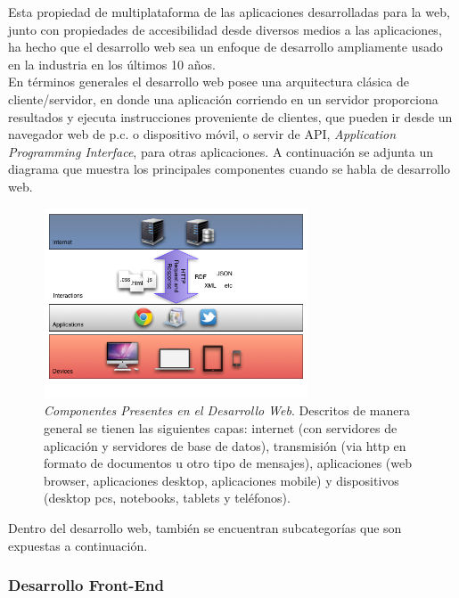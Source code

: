 Esta propiedad de multiplataforma de las aplicaciones desarrolladas para la web, junto con propiedades de accesibilidad desde diversos medios a las aplicaciones, ha hecho que el desarrollo web sea un enfoque de desarrollo ampliamente usado en la industria en los últimos 10 años.\\

En términos generales el desarrollo web posee una arquitectura clásica de cliente/servidor, en donde una aplicación corriendo en un servidor proporciona resultados y ejecuta instrucciones proveniente de clientes, que pueden ir desde un navegador web de p.c. o dispositivo móvil, o servir de API, \emph{Application Programming Interface}, para otras aplicaciones. A continuación se adjunta un diagrama que muestra los principales componentes cuando se habla de desarrollo web.\\

\begin{figure}[H]
  \centering
  \includegraphics[width=0.7\textwidth]{images/web_development.png}
  \caption[Componentes Presentes en el Desarrollo Web]{\emph{Componentes Presentes en el Desarrollo Web}. Descritos de manera general se tienen las siguientes capas: internet (con servidores de aplicación y servidores de base de datos), transmisión (via http en formato de documentos u otro tipo de mensajes), aplicaciones (web browser, aplicaciones desktop, aplicaciones mobile) y dispositivos (desktop pcs, notebooks, tablets y teléfonos).}
  \label{web_development}
\end{figure}

Dentro del desarrollo web, también se encuentran subcategorías que son expuestas a continuación.

\subsubsection{Desarrollo Front-End} %
\label{ssub:desarrollo_front_end}

